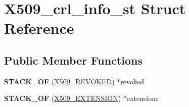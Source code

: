 \hypertarget{struct_x509__crl__info__st}{}\section{X509\+\_\+crl\+\_\+info\+\_\+st Struct Reference}
\label{struct_x509__crl__info__st}
\subsection*{Public Member Functions}
\begin{DoxyCompactItemize}
\item 
\mbox{\label{struct_x509__crl__info__st_ab9897d2f018a6791c45ab9427ba06acf}} 
{\bfseries S\+T\+A\+C\+K\+\_\+\+OF} (\hyperlink{structx509__revoked__st}{X509\+\_\+\+R\+E\+V\+O\+K\+ED}) $\ast$revoked
\item 
\mbox{\label{struct_x509__crl__info__st_ad001fb81e73be4c52d5d52950c720e9c}} 
{\bfseries S\+T\+A\+C\+K\+\_\+\+OF} (\hyperlink{struct_x509__extension__st}{X509\+\_\+\+E\+X\+T\+E\+N\+S\+I\+ON}) $\ast$extensions
\end{DoxyCompactItemize}
